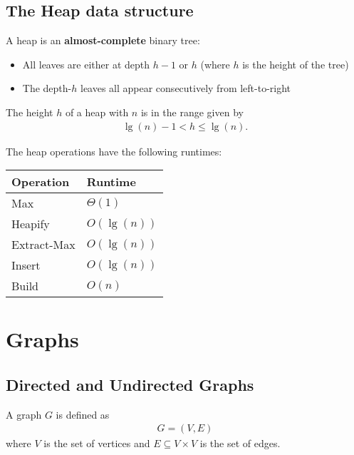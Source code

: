 \documentclass{article}
\begin{document}
\subsection{The Heap data structure}


\begin{definition}
	A heap is an \textbf{almost-complete} binary tree:
	\begin{itemize}
		\item All leaves are either at depth $h-1$ or $h$ (where $h$ is the height of the tree)
		\item The depth-$h$ leaves all appear consecutively from left-to-right
	\end{itemize}
\end{definition}
\begin{lemma}
	The height $h$ of a heap with $n$ is in the range given by
	\begin{align*}
		\lg(n)-1 < h \leq \lg(n).
	\end{align*}
\end{lemma}
\begin{theorem}
	The heap operations have the following runtimes:
	\\
	\begin{center}
	\begin{tabular}{| l | l |}
		\hline
		Operation & Runtime\\
		\hline
		Max & $\Theta(1)$\\
		\hline
		Heapify & $O(\lg(n))$\\
		\hline
		Extract-Max & $O(\lg(n))$\\
		\hline
		Insert & $O(\lg(n))$\\
		\hline
		Build & $O(n)$\\
		\hline
	\end{tabular}
	\end{center}
\end{theorem}


\section{Graphs}


\subsection{Directed and Undirected Graphs}

\begin{definition}
	A graph $G$ is defined as
	\begin{align*}
		G = (V,E)
	\end{align*}
	where $V$ is the set of vertices and $E\subseteq V\times V$ is the set of edges.
\end{definition}
\end{document}
